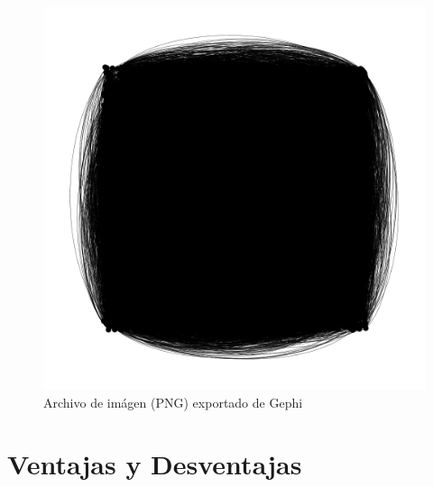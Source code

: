 \documentclass[acmlarge,screen]{acmart}
\begin{document}
\begin{figure}[h!]
 \includegraphics[scale=0.27]{GML_Imagen.png}
 \caption{Archivo de imágen (PNG) exportado de Gephi}
 \label{fig:gephiImg}
\end{figure}

\section{Ventajas y Desventajas}
\end{document}
